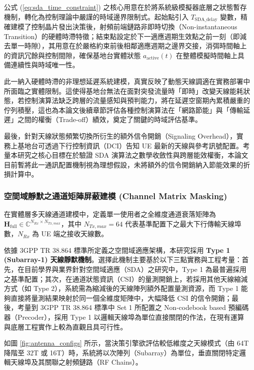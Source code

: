 公式 (\ref{eq:sda_time_constraint}) 之核心用意在於將系統級模擬器底層之狀態暫存機制，轉化為控制理論中嚴謹的時域邊界限制式。起始點引入 $T_{\text{SDA\_delay}}$ 變數，精確建模了控制晶片發出決策後，射頻前端鏈路非即時切換（Non-instantaneous Transition）的硬體時滯特徵；結束點設定於下一適應週期生效點之前一刻（即減去單一時隙），其用意在於嚴格約束前後相鄰適應週期之邊界交接，消弭時間軸上的資訊冗餘與控制間隙，確保基地台實體狀態 $a_{\text{active}}(t)$ 在整體模擬時間軸上具備連續性與時域唯一性。

此一納入硬體時滯的非理想延遲系統建模，真實反映了動態天線調適在實務部署中所面臨之實體限制。這使得基地台無法在面對突發流量時「即時」改變天線能耗狀態，若控制演算法缺乏跨層的流量感知與預判能力，將在延遲空窗期內累積嚴重的佇列積壓，這也為本論文後續章節評估各種控制演算法在「網路節能」與「傳輸延遲」之間的權衡（Trade-off）績效，奠定了關鍵的時域評估基準。

最後，針對天線狀態頻繁切換所衍生的額外信令開銷（Signaling Overhead），實務上基地台可透過下行控制資訊（DCI）告知 UE 最新的天線與參考訊號配置。考量本研究之核心目標在於驗證 SDA 演算法之數學收斂性與跨層能效權衡，本論文目前暫將此一通訊配置機制視為理想假設，未將額外的信令開銷納入節能效果的折損計算中。

\subsubsection{空間域靜默之通道矩陣屏蔽建模 (Channel Matrix Masking)}

在實體層多天線通道建模中，定義單一使用者之全維度通道衰落矩陣為 $\boldsymbol{H}_{\text{full}} \in \mathbb{C}^{N_{Rx} \times N_{Tx, max}}$，其中 $N_{Tx, max} = 64$ 代表基準配置下之最大下行傳輸天線埠數，$N_{Rx}$ 為 UE 端之接收天線數。

依據 3GPP TR 38.864 標準所定義之空間域適應架構，本研究採用 \textbf{Type 1 (Subarray-1) 天線靜默機制}。選擇此機制主要基於以下三點實務與工程考量：首先，在目前學界與業界針對空間域適應（SDA）之研究中，Type 1 為最普遍採用之基準配置；其次，在通道狀態資訊（CSI）的量測開銷上，若採用其他天線縮減方式（如 Type 2），系統需為縮減後的天線陣列額外配置量測資源，而 Type 1 能夠直接將量測結果映射於同一個全維度矩陣中，大幅降低 CSI 的信令開銷；最後，考量到 3GPP TR 38.864 標準中 Set 1 所配置之 Non-codebook based 預編碼器（Precoder），採用 Type 1 以邏輯天線埠為單位直接關閉的作法，在現有運算與底層工程實作上較為直觀且具可行性。

如圖 \ref{fig:antenna_configs} 所示，當決策引擎欲評估較低維度之天線模式（由 64T 降階至 32T 或 16T）時，系統將以次陣列（Subarray）為單位，垂直關閉特定邏輯天線埠及其關聯之射頻鏈路（RF Chains）。


